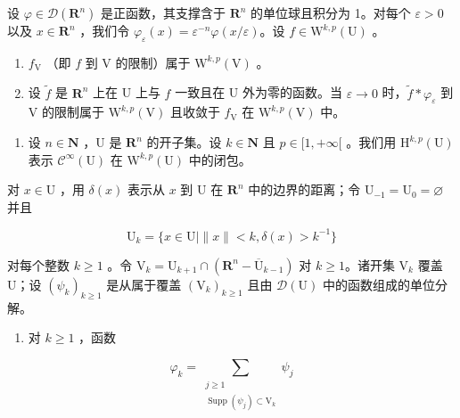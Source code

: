 设 \(\varphi \in \mathcal{D}(\mathbf{R}^n)\) 是正函数，其支撑含于 \(\mathbf{R}^n\) 的单位球且积分为 1。对每个 \(\varepsilon > 0\) 以及 \(x \in \mathbf{R}^n\) ，我们令 \(\varphi_{\varepsilon}(x) = \varepsilon^{-n}\varphi(x/\varepsilon)\)。设 \(f \in \mathrm{W}^{k,p}(\mathrm{U})\) 。

\begin{enumerate}
\def\labelenumi{\alph{enumi})}
\item
  \(f_{\mathrm{V}}\) （即 \(f\) 到 V 的限制）属于 \(\mathrm{W}^{k,p}(\mathrm{V})\) 。
\item
  设 \(\widetilde{f}\) 是 \(\mathbf{R}^n\) 上在 U 上与 \(f\) 一致且在 U 外为零的函数。当 \(\varepsilon \to 0\) 时，\(\widetilde{f} * \varphi_{\varepsilon}\) 到 V 的限制属于 \(\mathrm{W}^{k,p}(\mathrm{V})\) 且收敛于 \(f_{\mathrm{V}}\) 在 \(\mathrm{W}^{k,p}(\mathrm{V})\) 中。
\end{enumerate}

\begin{enumerate}
\def\labelenumi{\arabic{enumi})}
\setcounter{enumi}{10}
\tightlist
\item
  设 \(n \in \mathbf{N}\) ，U 是 \(\mathbf{R}^n\) 的开子集。设 \(k \in \mathbf{N}\) 且 \(p \in [1, +\infty[\) 。我们用 \(\mathrm{H}^{k,p}(\mathrm{U})\) 表示 \(\mathcal{C}^{\infty}(\mathrm{U})\) 在 \(\mathrm{W}^{k,p}(\mathrm{U})\) 中的闭包。
\end{enumerate}

对 \(x \in \mathrm{U}\) ，用 \(\delta(x)\) 表示从 \(x\) 到 \(\mathrm{U}\) 在 \(\mathbf{R}^n\) 中的边界的距离；令 \(\mathrm{U}_{-1} = \mathrm{U}_0 = \varnothing\) 并且

\[
\mathrm{U} _ {k} = \{x \in \mathrm{U} | \| x \| <   k, \delta (x) > k ^ {- 1} \}
\]

对每个整数 \(k \geqslant 1\) 。令 \(\mathrm{V}_k = \mathrm{U}_{k+1} \cap (\mathbf{R}^n - \overline{\mathrm{U}}_{k-1})\) 对 \(k \geqslant 1\)。诸开集 \(\mathrm{V}_k\) 覆盖 U；设 \((\psi_k)_{k \geqslant 1}\) 是从属于覆盖 \((\mathrm{V}_k)_{k \geqslant 1}\) 且由 \(\mathcal{D}(\mathrm{U})\) 中的函数组成的单位分解。

\begin{enumerate}
\def\labelenumi{\alph{enumi})}
\tightlist
\item
  对 \(k \geqslant 1\) ，函数
\end{enumerate}

\[
\varphi_{k} = \sum_{\substack{j\geqslant 1\\ \operatorname{Supp}(\psi_{j})\subset \mathrm{V}_{k}}}\psi_{j}
\]

